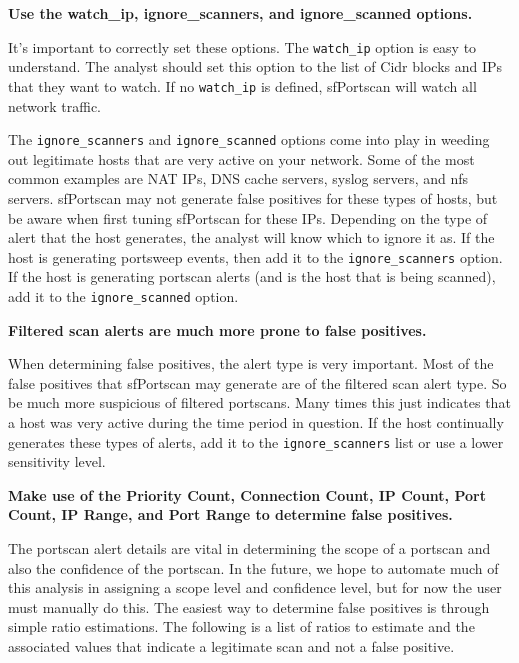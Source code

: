 \documentclass[english]{report}
\newcounter{slistnum}
\newenvironment{slist}
{ \begin{list}{ {\bf \arabic{slistnum}.} }{\usecounter{slistnum} } }
{ \end{list} }
\begin{document}
\begin{slist}

\item \textbf{Use the watch\_ip, ignore\_scanners, and ignore\_scanned options.}
  
It's important to correctly set these options.  The \texttt{watch\_ip} option
is easy to understand.  The analyst should set this option to the list of Cidr
blocks and IPs that they want to watch.  If no \texttt{watch\_ip} is defined,
sfPortscan will watch all network traffic.
     
The \texttt{ignore\_scanners} and \texttt{ignore\_scanned} options come into
play in weeding out legitimate hosts that are very active on your network.
Some of the most common examples are NAT IPs, DNS cache servers, syslog
servers, and nfs servers.  sfPortscan may not generate false positives for
these types of hosts, but be aware when first tuning sfPortscan for these IPs.
Depending on the type of alert that the host generates, the analyst will know
which to ignore it as.  If the host is generating portsweep events, then add it
to the \texttt{ignore\_scanners} option.  If the host is generating portscan
alerts (and is the host that is being scanned), add it to the
\texttt{ignore\_scanned} option.
  
\item \textbf{Filtered scan alerts are much more prone to false positives.}
  
When determining false positives, the alert type is very important.  Most of
the false positives that sfPortscan may generate are of the filtered scan alert
type.  So be much more suspicious of filtered portscans.  Many times this just
indicates that a host was very active during the time period in question.  If
the host continually generates these types of alerts, add it to the
\texttt{ignore\_scanners} list or use a lower sensitivity level.
     
\item \textbf{Make use of the Priority Count, Connection Count, IP Count, Port
Count, IP Range, and Port Range to determine false positives.}
     
The portscan alert details are vital in determining the scope of a portscan and
also the confidence of the portscan.  In the future, we hope to automate much
of this analysis in assigning a scope level and confidence level, but for now
the user must manually do this.  The easiest way to determine false positives
is through simple ratio estimations.  The following is a list of ratios to
estimate and the associated values that indicate a legitimate scan and not a
false positive.
     

\end{slist}
\end{document}
